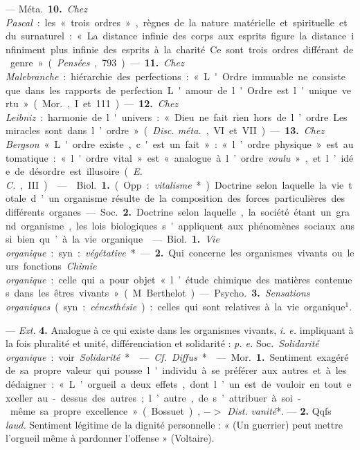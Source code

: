 \begin{itemize}[leftmargin=1cm, label=, itemsep=1pt]
— \si{Méta.} {\bf 10.} {\it Chez Pascal} : les « trois ordres », règnes de la
nature matérielle et spirituelle et du surnaturel : « La distance infinie des
corps aux esprits figure la distance infiniment plus infinie des esprits à la
charité. Ce sont trois ordres différant de genre. » ({\it Pensées}, 793). —
{\bf 11.} {\it Chez Malebranche} : hiérarchie des perfections : « L'Ordre
immuable ne consiste que dans les rapports de perfection. L'amour de l'Ordre
est l'unique vertu » (\si{Mor.}, I et 111). — {\bf 12.} {\it Chez Leibniz} :
harmonie de l'univers : « Dieu ne fait rien hors de l’ordre... Les miracles
sont dans l’ordre » ({\it Disc. méta.}, VI et VII). — {\bf 13.} {\it Chez
Bergson} « L'ordre existe, c'est un fait » : « l’ordre physique » est
automatique: « l'ordre vital » est « analogue à l’ordre {\it voulu} », et
l’idée de désordre est illusoire ({\it E. C.}, III).

 —  \si{Biol.} {\bf 1.} (Opp. :
{\it vitalisme}*). Doctrine selon laquelle la vie totale d’un organisme
résulte de la composition des forces particulières des différents organes. —
\si{Soc.} {\bf 2.} Doctrine selon laquelle, la société étant un grand
organisme, les lois biologiques s'appliquent aux phénomènes sociaux aussi
bien qu’à la vie organique.

 — \si{Biol.} {\bf 1.} {\it Vie organique} : syn. :
{\it végétative}*. — {\bf 2.} Qui concerne
les organismes vivants ou leurs fonctions. {\it Chimie organique} : celle qui
a pour objet « l’étude chimique des matières contenues dans les êtres
vivants » (M. Berthelot).

— \si{Psycho.} {\bf 3.} {\it Sensations organiques} (syn. :
{\it cénesthésie}) : celles qui sont relatives à la vie organique$^1$.

— {\it Ext.} {\bf 4.} Analogue à ce qui existe dans les organismes vivants,
{\it i. e.} impliquant à la fois pluralité et unité, différenciation et
solidarité : {\it p. e.} \si{Soc.} {\it Solidarité organique} : voir
{\it Solidarité}*.

 — {\it Cf.} {\it Diffus}*.

 — \si{Mor.} {\bf 1.} Sentiment exagéré de sa propre valeur qui
pousse l'individu à se préférer aux autres et à les dédaigner : « L’orgueil a
deux effets, dont l’un est de vouloir en tout exceller au-dessus des autres ;
l’autre, de s’attribuer à soi-même sa propre excellence » (Bossuet), $->$
{\it Dist.} {\it vanité}*. —  {\bf 2.} Qqfs {\it laud.} Sentiment légitime de
la dignité personnelle : « (Un guerrier) peut mettre l’orgueil même à
pardonner l'offense » (Voltaire).


\end{itemize}
